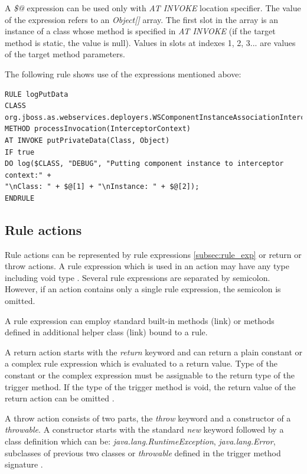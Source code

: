 \documentclass[12pt,oneside]{fithesis2}
\begin{document}
A \textit{\$@} expression can be used only with \textit{AT INVOKE} location specifier. The value of the expression refers to an \textit{Object[]} array. The first slot in the array is an instance of a class whose method is specified in \textit{AT INVOKE} (if the target method is static, the value is null). Values in slots at indexes 1, 2, 3... are values of the target method parameters.

The following rule shows use of the expressions mentioned above:
\begin{lstlisting}[caption = Rule Expressions, label = rule_expressions_code]
RULE logPutData
CLASS org.jboss.as.webservices.deployers.WSComponentInstanceAssociationInterceptor
METHOD processInvocation(InterceptorContext)
AT INVOKE putPrivateData(Class, Object)
IF true
DO log($CLASS, "DEBUG", "Putting component instance to interceptor context:" +
"\nClass: " + $@[1] + "\nInstance: " + $@[2]);
ENDRULE
\end{lstlisting}

\subsection{Rule actions}
Rule actions can be represented by rule expressions \ref{subsec:rule_exp} or return or throw actions. A rule expression which is used in an action may have any type including void type \cite[Rule actions]{byteman_doc}. Several rule expressions are separated by semicolon. However, if an action contains only a single rule expression, the semicolon is omitted.

A rule expression can employ standard built-in methods (link) or methods defined in additional helper class (link) bound to a rule.

A return action starts with the \textit{return} keyword and can return a plain constant or a complex rule expression which is evaluated to a return value. Type of the constant or the complex expression must be assignable to the return type of the trigger method. If the type of the trigger method is void, the return value of the return action can be omitted \cite[Rule actions]{byteman_doc}.

A throw action consists of two parts, the \textit{throw} keyword and a constructor of a \textit{throwable}. A constructor starts with the standard \textit{new} keyword followed by a class definition which can be: \textit{java.lang.RuntimeException}, \textit{java.lang.Error}, subclasses of previous two classes or \textit{throwable} defined in the trigger method signature \cite[Rule actions]{byteman_doc}.
\end{document}
